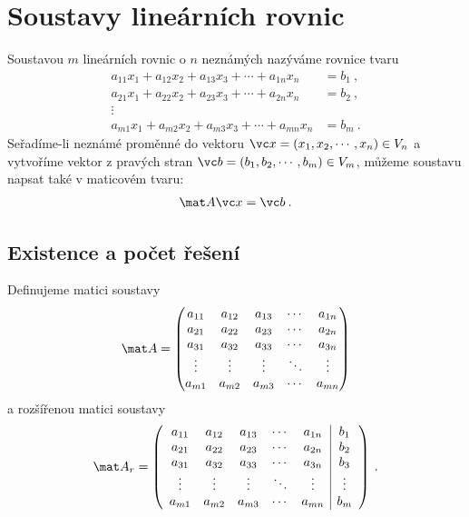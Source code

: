 \section*{Soustavy lineárních rovnic}

Soustavou $m$ lineárních rovnic o $n$ neznámých nazýváme rovnice tvaru
\begin{align}
    a_{11} x_1 + a_{12} x_2 + a_{13} x_3 + \cdots + a_{1n} x_n &= b_1 \:, \\
    a_{21} x_1 + a_{22} x_2 + a_{23} x_3 + \cdots + a_{2n} x_n &= b_2 \:, \\
    \vdots \\
    a_{m1} x_1 + a_{m2} x_2 + a_{m3} x_3 + \cdots + a_{mn} x_n &= b_m \:.
\end{align}
Seřadíme-li neznámé proměnné do vektoru $ \vc x = (x_1, x_2, \cdots, x_n) \in V_n$ a vytvoříme vektor z pravých stran \newline$\vc b = (b_1, b_2, \cdots, b_m) \in V_m$, můžeme soustavu napsat také v maticovém tvaru:
\begin{align}
    \mat A \vc x = \vc b \:.
\end{align}

\subsection*{Existence a počet řešení}

Definujeme matici soustavy \begin{align}
    \mat A = \begin{pmatrix}
        a_{11} & a_{12} & a_{13} & \cdots & a_{1n} \\
        a_{21} & a_{22} & a_{23} & \cdots & a_{2n} \\
        a_{31} & a_{32} & a_{33} & \cdots & a_{3n} \\
        \vdots & \vdots & \vdots & \ddots & \vdots \\
        a_{m1} & a_{m2} & a_{m3} & \cdots & a_{mn} 
    \end{pmatrix}
\end{align}
a rozšířenou matici soustavy \begin{align}
    \mat A_r = 
    \left(\begin{array}{ccccc|c}
        a_{11} & a_{12} & a_{13} & \cdots & a_{1n} & b_1\\
        a_{21} & a_{22} & a_{23} & \cdots & a_{2n} & b_2\\
        a_{31} & a_{32} & a_{33} & \cdots & a_{3n} & b_3\\
        \vdots & \vdots & \vdots & \ddots & \vdots & \vdots\\
        a_{m1} & a_{m2} & a_{m3} & \cdots & a_{mn} & b_m \\
        \end{array}\right) \:.
\end{align}

